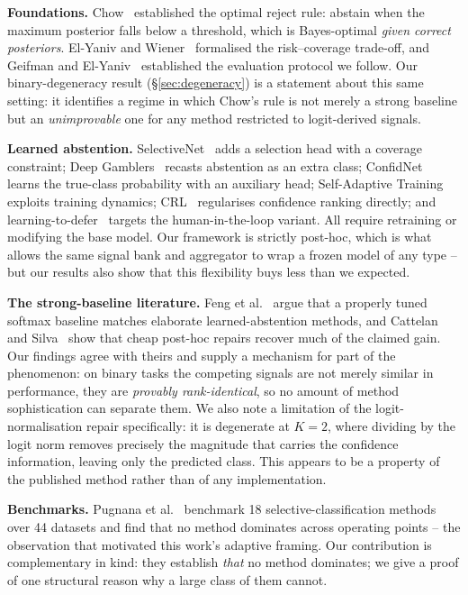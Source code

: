 \documentclass[conference]{IEEEtran}
\begin{document}
\textbf{Foundations.} Chow~\cite{chow1970} established the optimal reject
rule: abstain when the maximum posterior falls below a threshold, which is
Bayes-optimal \emph{given correct posteriors}. El-Yaniv and
Wiener~\cite{elyaniv2010foundations} formalised the risk--coverage
trade-off, and Geifman and El-Yaniv~\cite{geifman2017selective} established
the evaluation protocol we follow. Our binary-degeneracy result
(\S\ref{sec:degeneracy}) is a statement about this same setting: it
identifies a regime in which Chow's rule is not merely a strong baseline
but an \emph{unimprovable} one for any method restricted to logit-derived
signals.

\textbf{Learned abstention.} SelectiveNet~\cite{geifman2019selectivenet}
adds a selection head with a coverage constraint; Deep
Gamblers~\cite{liu2019deepgamblers} recasts abstention as an extra class;
ConfidNet~\cite{corbiere2019confidnet} learns the true-class probability
with an auxiliary head; Self-Adaptive Training~\cite{huang2020sat} exploits
training dynamics; CRL~\cite{moon2020crl} regularises confidence ranking
directly; and learning-to-defer~\cite{mozannar2020defer} targets the
human-in-the-loop variant. All require retraining or modifying the base
model. Our framework is strictly post-hoc, which is what allows the same
signal bank and aggregator to wrap a frozen model of any type -- but our
results also show that this flexibility buys less than we expected.

\textbf{The strong-baseline literature.} Feng et
al.~\cite{feng2023better} argue that a properly tuned softmax baseline
matches elaborate learned-abstention methods, and Cattelan and
Silva~\cite{cattelan2023logitnorm} show that cheap post-hoc repairs
recover much of the claimed gain. Our findings agree with theirs and
supply a mechanism for part of the phenomenon: on binary tasks the
competing signals are not merely similar in performance, they are
\emph{provably rank-identical}, so no amount of method sophistication can
separate them. We also note a limitation of the logit-normalisation
repair specifically: it is degenerate at $K{=}2$, where dividing by the
logit norm removes precisely the magnitude that carries the confidence
information, leaving only the predicted class. This appears to be a
property of the published method rather than of any implementation.

\textbf{Benchmarks.} Pugnana et al.~\cite{pugnana2024benchmark} benchmark
18 selective-classification methods over 44 datasets and find that no
method dominates across operating points -- the observation that motivated
this work's adaptive framing. Our contribution is complementary in kind:
they establish \emph{that} no method dominates; we give a proof of one
structural reason why a large class of them cannot.
\end{document}
